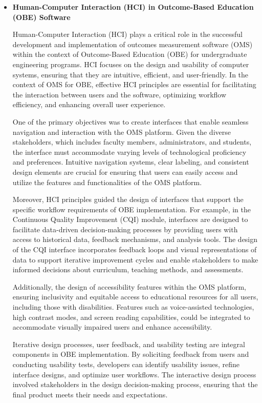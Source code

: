 \documentclass[journal,onecolumn]{IEEEtran}
\begin{document}
\begin{itemize}
\item \textbf{Human-Computer Interaction (HCI) in Outcome-Based Education (OBE) Software}

Human-Computer Interaction (HCI) plays a critical role in the successful development and implementation of outcomes measurement software (OMS) within the context of Outcome-Based Education (OBE) for undergraduate engineering programs. HCI focuses on the design and usability of computer systems, ensuring that they are intuitive, efficient, and user-friendly. In the context of OMS for OBE, effective HCI principles are essential for facilitating the interaction between users and the software, optimizing workflow efficiency, and enhancing overall user experience.

One of the primary objectives was to create interfaces that enable seamless navigation and interaction with the OMS platform. Given the diverse stakeholders, which includes faculty members, administrators, and students, the interface must accommodate varying levels of technological proficiency and preferences. Intuitive navigation systems, clear labeling, and consistent design elements are crucial for ensuring that users can easily access and utilize the features and functionalities of the OMS platform.

Moreover, HCI principles guided the design of interfaces that support the specific workflow requirements of OBE implementation. For example, in the Continuous Quality Improvement (CQI) module, interfaces are designed to facilitate data-driven decision-making processes by providing users with access to historical data, feedback mechanisms, and analysis tools. The design of the CQI interface incorporates feedback loops and visual representations of data to support iterative improvement cycles and enable stakeholders to make informed decisions about curriculum, teaching methods, and assessments.

Additionally, the design of accessibility features within the OMS platform, ensuring inclusivity and equitable access to educational resources for all users, including those with disabilities. Features such as voice-assisted technologies, high contrast modes, and screen reading capabilities, could be integrated to accommodate visually impaired users and enhance accessibility.

Iterative design processes, user feedback, and usability testing are integral components in OBE implementation. By soliciting feedback from users and conducting usability tests, developers can identify usability issues, refine interface designs, and optimize user workflows. The interactive design process involved stakeholders in the design decision-making process, ensuring that the final product meets their needs and expectations.


\end{itemize}
\end{document}
